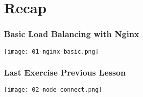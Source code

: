 \section{Recap}

\frame{\tableofcontents[currentsection]}

\begin{frame}
    \frametitle{Basic Load Balancing with Nginx}
    \begin{center}
        \texttt{[image: 01-nginx-basic.png]}
    \end{center}

\end{frame}

\begin{frame}
    \frametitle{Last Exercise Previous Lesson}
    \begin{center}
        \texttt{[image: 02-node-connect.png]}
    \end{center}

\end{frame}
